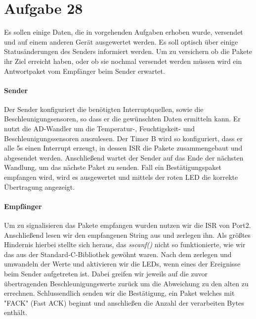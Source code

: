 \section*{Aufgabe 28}
Es sollen einige Daten, die in vorgehenden Aufgaben erhoben wurde, versendet und auf einem anderen Gerät ausgewertet werden. Es soll optisch über einige Statusänderungen des Senders informiert werden. Um zu versichern ob die Pakete ihr Ziel erreicht haben, oder ob sie nochmal versendet werden müssen wird ein Antwortpaket vom Empfänger beim Sender erwartet.


\paragraph*{Sender}
Der Sender konfiguriert die benötigten Interruptquellen, sowie die Beschleunigungsensoren, so dass er die gewünschten Daten ermitteln kann. Er nutzt die AD-Wandler um die Temperatur-, Feuchtigskeit- und Beschleunigungssensoren auszulesen. Der Timer B wird so konfiguriert, dass er alle 5s einen Interrupt erzeugt, in dessen ISR die Pakete zusammengebaut und abgesendet werden. Anschließend wartet der Sender auf das Ende der nächsten Wandlung, um das nächste Paket zu senden. Fall ein Bestätigungspaket empfangen wird, wird es ausgewertet und  mittels der roten LED die korrekte Übertragung angezeigt.



\paragraph*{Empfänger}
Um zu signalisieren das Pakete empfangen wurden nutzen wir die ISR von Port2. Anschließend lesen wir den empfangenen String aus und zerlegen ihn. Als größtes Hindernis hierbei stellte sich heraus, das {\em sscanf()} nicht so funktionierte, wie wir das aus der Standard-C-Bibliothek gewöhnt waren. Nach dem zerlegen und umwandeln der Werte und aktivieren wir die LEDs, wenn eines der Ereignisse beim Sender aufgetreten ist. Dabei greifen wir jeweils auf die zuvor übertragenden Beschleunigungswerte zurück um die Abweichung zu den alten zu errechnen. Schlussendlich senden wir die Bestätigung, ein Paket welches mit "FACK" (Fast ACK) beginnt und anschließen die Anzahl der verarbeiten Bytes enthält. 






